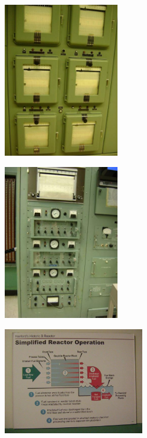 \documentclass[aspectratio=1610,pdftex,dvipsnames,compress,xcolor={dvipsnames}]{beamer}
\begin{document}
\begin{frame}{}
    \begin{figure}
        \centering
        \includegraphics[width=0.45\textwidth]{hb7.jpg}
    \end{figure}
\end{frame}


\begin{frame}{}
    \begin{figure}
        \centering
        \includegraphics[width=0.45\textwidth]{hb8.jpg}
    \end{figure}
\end{frame}


\begin{frame}{}
    \begin{figure}
        \centering
        \includegraphics[width=0.55\textwidth]{hb9.jpg}
    \end{figure}
\end{frame}
\end{document}
